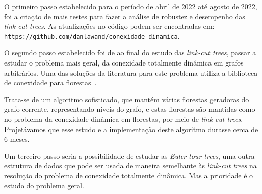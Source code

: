 O primeiro passo estabelecido para o período de abril de 2022 até agosto de 2022, foi a criação de mais testes para fazer a análise de robustez e desempenho das \emph{link-cut trees}. As atualizações no código podem ser encontradas em: \texttt{https://github.com/danlawand/conexidade-dinamica}.

O segundo passo estabelecido foi de ao final do estudo das \emph{link-cut trees}, passar a estudar o problema mais geral, da conexidade totalmente dinâmica em grafos arbitrários.  Uma das soluções da literatura para este problema utiliza a biblioteca de conexidade para florestas~\cite{HolmLT2001}.

Trata-se de um algoritmo sofisticado, que mantém várias florestas geradoras do grafo corrente, representando níveis do grafo, e estas florestas são mantidas como no problema da conexidade dinâmica em florestas, por meio de \emph{link-cut trees}.  Projetávamos que esse estudo e a implementação deste algoritmo durasse cerca de 6 meses. 

Um terceiro passo seria a possibilidade de estudar as \emph{Euler tour trees}, uma outra estrutura de dados que pode ser usada de maneira semelhante às \emph{link-cut trees} na resolução do problema de conexidade totalmente dinâmica. Mas a prioridade é o estudo do problema geral. 

